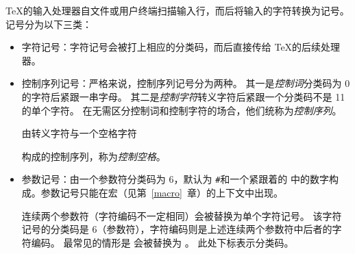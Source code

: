 \documentclass{book}
\begin{document}
\TeX 的输入处理器自文件或用户终端扫描输入行，而后将输入的字符转换为记号。
记号分为以下三类：
\begin{itemize}
\item 字符记号：字符记号会被打上相应的分类码，而后直接传给 \TeX 的后续处理器。
\item 控制序列记号：严格来说，控制序列记号分为两种。
其一是\emph{控制词}\ldash 分类码为 0 的字符后紧跟一串字母。
其二是\emph{控制字符}\ldash 转义字符后紧跟一个分类码不是 11 的单个字符。
在无需区分控制词和控制字符的场合，他们统称为\emph{控制序列}。

由转义字符与一个空格字符 \cstoidx {}\par\cs{}\textvisiblespace 构成的控制序列，称为\emph{控制空格}。

\item 参数记号：由一个参数符\ldash 分类码为 6，默认为 \verb-#-\rdash 和一个紧跟着的 中的数字构成。参数记号只能在宏（见第~\ref{macro}~章）的上下文中出现。

连续两个参数符（字符编码不一定相同）会被替换为单个字符记号。
该字符记号的分类码是 6（参数符），字符编码则是上述连续两个参数符中后者的字符编码。
最常见的情形是 \n{\#\#} 会被替换为 。
此处下标表示分类码。
\end{itemize}
\end{document}

